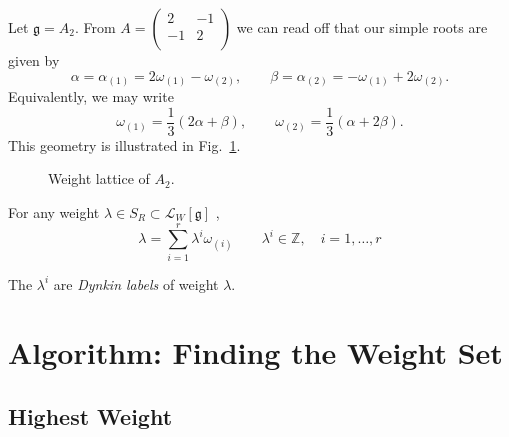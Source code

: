 \begin{example}[]
  Let $\mathfrak{g} = A_2$. From $A = 
    \begin{pmatrix}
     2 & -1 \\
     -1 & 2 \\
    \end{pmatrix} $ we can read off that our simple roots are given by
  \begin{equation}
    \alpha = \alpha_{(1)} = 2 \omega_{(1)} - \omega_{(2)}, \qquad
    \beta = \alpha_{(2)} = -\omega_{(1)} + 2 \omega_{(2)}.
  \end{equation}
  Equivalently, we may write
  \begin{equation}
    \omega_{(1)} = \frac{1}{3} (2\alpha + \beta), \qquad 
    \omega_{(2)} = \frac{1}{3} (\alpha + 2\beta).
  \end{equation}
  This geometry is illustrated in Fig.~\ref{fig:l22f1}.
\end{example}

\begin{figure}[tbhp]
  \centering
  \def\svgwidth{0.4\columnwidth}
  
  \caption{Weight lattice of $A_2$.}
  \label{fig:l22f1}
\end{figure}

For any weight $\lambda \in S_R \subset \mathcal{L}_W[\mathfrak{g}]$ , 
\begin{equation}
  \lambda = \sum_{i=1}^{r} \lambda^{i} \omega_{(i)} \qquad \lambda^{i} \in \mathbb{Z}, \quad i = 1, \dots, r
\end{equation}

\begin{definition}[]
  The $\lambda^{i}$ are \emph{Dynkin labels} of weight $\lambda$.
\end{definition}

\section{Algorithm: Finding the Weight Set}%
\label{sec:highest_weight_representations}

\subsection*{Highest Weight}%

